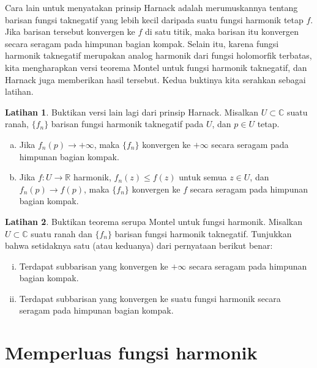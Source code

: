 \documentclass[12pt,openany]{book}
\newcommand{\C}{{\mathbb{C}}}
\newcommand{\R}{{\mathbb{R}}}
\theoremstyle{plain}
\theoremstyle{remark}
\theoremstyle{definition}
\newenvironment{exbox}{%
    \def\FrameCommand{\vrule width 1pt \relax\hspace{10pt}}%
    \MakeFramed{\advance\hsize-\width\FrameRestore}%
}{%
    \endMakeFramed
}
\newenvironment{exparts}{%
    \leavevmode\begin{enumerate}[a),noitemsep,topsep=0pt,parsep=0pt,partopsep=0pt]
}{%
    \end{enumerate}
}
\theoremstyle{exercise}
\newtheorem{exercise}{Latihan}[section]
\theoremstyle{example}
\begin{document}
Cara lain untuk menyatakan prinsip Harnack adalah merumuskannya tentang
barisan fungsi taknegatif yang lebih kecil
daripada suatu fungsi harmonik tetap $f$.  Jika barisan tersebut konvergen ke $f$ di
satu titik, maka barisan itu konvergen secara seragam pada himpunan bagian kompak.  Selain itu, karena
fungsi harmonik taknegatif merupakan analog harmonik dari fungsi holomorfik
terbatas, kita mengharapkan versi teorema Montel untuk fungsi harmonik
taknegatif, dan Harnack juga memberikan hasil tersebut.  Kedua buktinya kita serahkan sebagai
latihan.

\begin{exbox}
\begin{exercise}
Buktikan versi lain lagi dari prinsip Harnack.
Misalkan $U \subset \C$ suatu ranah,
$\{ f_n \}$ barisan fungsi harmonik taknegatif pada
$U$, dan $p \in U$ tetap.
\begin{exparts}
\item
Jika $f_n(p) \to +\infty$, maka $\{ f_n \}$ konvergen ke $+\infty$ secara seragam pada
himpunan bagian kompak.
\item
Jika $f \colon U \to \R$ harmonik, $f_n(z) \leq f(z)$ untuk semua $z \in U$,
dan $f_n(p) \to f(p)$, maka $\{ f_n \}$ konvergen ke $f$ secara seragam pada
himpunan bagian kompak.
\end{exparts}
\end{exercise}

\begin{exercise}
Buktikan teorema serupa Montel untuk fungsi harmonik.  Misalkan $U \subset \C$
suatu ranah dan $\{ f_n \}$ barisan fungsi harmonik taknegatif.
Tunjukkan bahwa setidaknya satu (atau keduanya) dari pernyataan berikut benar:
\begin{enumerate}[(i)]
\item
Terdapat subbarisan yang konvergen ke $+\infty$ secara seragam pada himpunan bagian kompak.
\item
Terdapat subbarisan yang konvergen ke suatu fungsi harmonik
secara seragam pada himpunan bagian kompak.
\end{enumerate}
\end{exercise}
\end{exbox}



\section{Memperluas fungsi harmonik}
\end{document}
